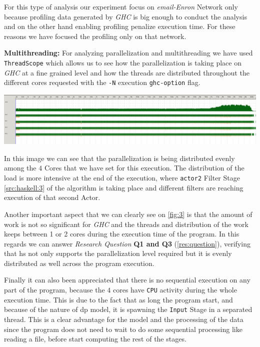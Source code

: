 \documentclass[preprint]{elsarticle}
\begin{document}
For this type of analysis our experiment focus on \textit{email-Enron} Network only because profiling data generated by \textit{GHC} is big enough to conduct the analysis and on the other hand enabling profiling penalize execution time. For these reasons we have focused the profiling only on that network.

\textbf{Multithreading:} For analyzing parallelization and multithreading we have used \texttt{ThreadScope} \cite{threadscope} which allows us to see how the parallelization is taking place on \textit{GHC} at a fine grained level and how the threads are distributed throughout the different cores requested with the \texttt{-N} execution \texttt{ghc-option} flag.

\begin{minipage}[t]{\linewidth}
  \includegraphics[width=\textwidth]{screen_1}
  \captionsetup{type=figure}
  \label{fig:3}
\end{minipage}

In this image we can see that the parallelization is being distributed evenly among the $4$ Cores that we have set for this execution.
The distribution of the load is more intensive at the end of the execution, where \texttt{actor2} Filter Stage \autoref{src:haskell:3} of the algorithm is taking place and different filters are reaching execution of that second Actor.

Another important aspect that we can clearly see on \autoref{fig:3} is that the amount of work is not so significant for \textit{GHC} and the threads and distribution of the work keeps between 1 or 2 cores during the execution time of the program. In this regards we can answer \emph{Research Question} \textbf{Q1 and Q3} (\autoref{res:question}), verifying that \acrshort{hs} not only supports the parallelization level required but it is evenly distributed as well across the program execution.

Finally it can also been appreciated that there is no sequential execution on any part of the program, because the $4$ cores have \texttt{CPU} activity during the whole execution time. This is due to the fact that as long the program start, and because of the nature of \acrshort{dp} model, it is spawning the \texttt{Input} Stage in a separated thread. This is a clear advantage for the model and the processing of the data since the program does not need to wait to do some sequential processing like reading a file, before start computing the rest of the stages.
\end{document}
